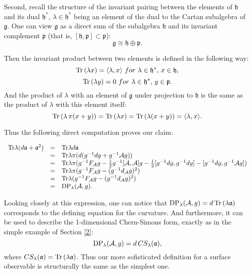 \documentclass[11pt]{report}
\theoremstyle{plain}
\theoremstyle{definition}
\theoremstyle{remark}
\theoremstyle{remark}
\numberwithin{equation}{section}
\begin{document}
Second, recall the structure of the invariant pairing between the elements of $\mathfrak{h}$ and its dual $\mathfrak{h}^*$, $\lambda \in \mathfrak{h}^*$ being an element of the dual to the Cartan subalgebra of $\mathfrak{g}$. One can view $\mathfrak{g}$ as a direct sum of the subalgebra $\mathfrak{h}$ and its invariant complement $\mathfrak{p}$ (that is,
$[\mathfrak{h}, \mathfrak{p}] \subset \mathfrak{p}$):
$$\mathfrak{g} \cong \mathfrak{h} \oplus \mathfrak{p}.$$

Then the invariant product between two elements is defined in the following way:
$$ {\rm Tr} \, (\lambda x) = \langle \lambda , x \rangle \, \, for \, \, \lambda \in \mathfrak{h}^*, \, x \in  \mathfrak{h},$$
$$ {\rm Tr} \, (\lambda y) = 0 \, \, for \, \, \lambda \in \mathfrak{h}^*, \, y \in  \mathfrak{p}.$$
And the product of $\lambda$ with an element of $\mathfrak{g}$ under projection to $\mathfrak{h}$ is the same as the product of $\lambda$ with this element itself:
$$ {\rm Tr} \,( \lambda \, \pi (x+y)) = {\rm Tr} \, (\lambda x)= {\rm Tr} \, (\lambda (x+y) )= \langle \lambda , x \rangle.$$

Thus the following direct computation proves our claim:
\begin{spacing}{1.45}
$\begin{array}{lll}
{\rm Tr} \lambda (d\mathfrak{a} + \mathfrak{a}^2) & = & {\rm Tr} \lambda d\mathfrak{a} \\
& =&  {\rm Tr} \lambda \pi(d(g^{-1} dg + g^{-1} \mathcal{A} g)) \\
& = & {\rm Tr} \lambda \pi (g^{-1} F_{\mathcal{A}} g - \frac{1}{2} g^{-1}[\mathcal{A},\mathcal{A}] g - \frac{1}{2} [g^{-1} dg , g^{-1} dg] - [g^{-1} dg , g^{-1} \mathcal{A}g]) \\
& = & {\rm Tr} \lambda \pi (g^{-1} F_{\mathcal{A}} g - (g^{-1} d_{\mathcal{A}} g)^2) \\
& =  & {\rm Tr} \lambda (g^{-1} F_{\mathcal{A}} g - (g^{-1} d_{\mathcal{A}} g)^2) \\
& =&  {\rm DP}_\lambda(\mathcal{A},g).
\end{array}$
\end{spacing} 
Looking closely at this expression, one can notice that $ {\rm DP}_\lambda(\mathcal{A},g) = d \, {\rm Tr} \, (\lambda \mathfrak{a})$ corresponds to the defining equation for the curvature. And furthermore, it can be used to describe the 1-dimensional Chern-Simons form, exactly as in the simple example of Section \ref{2}:
$$   {\rm DP}_\lambda(\mathcal{A},g) = d \, CS_\lambda (\mathfrak{a}),$$
where $CS_\lambda (\mathfrak{a})= {\rm Tr} \, (\lambda \mathfrak{a})$.
Thus our more sofisticated definition for a surface observable is structurally the same as the simplest one. 
\end{document}
